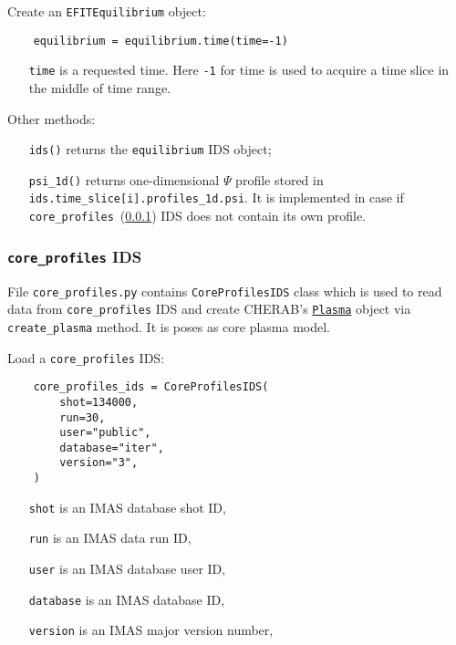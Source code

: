 \documentclass[../main.tex]{subfiles}
\begin{document}
Create an \texttt{EFITEquilibrium} object:
\begin{verbatim}
    equilibrium = equilibrium.time(time=-1)
\end{verbatim}

\begin{itemize}[align=left]
    \item[\texttt{time}] is a requested time. Here \texttt{-1} for time is used to acquire a time slice in the middle of time range.
\end{itemize}

Other methods:
\begin{itemize}[align=left]
    \item[\texttt{ids()}] returns the \texttt{equilibrium} IDS object;
    \item[\texttt{psi\_1d()}] returns one-dimensional $\Psi$ profile stored in \texttt{ids.time\_slice[i].profiles\_1d.psi}. It is implemented in case if \texttt{core\_profiles}~(\cref{sec:core_profiles_ids}) IDS does not contain its own profile.
\end{itemize}

\subsubsection{\texttt{core\_profiles} IDS}%
\label{sec:core_profiles_ids}

File \texttt{core\_profiles.py} contains \texttt{CoreProfilesIDS} class which is used to read data from \texttt{core\_profiles} IDS and create CHERAB's \href{https://cherab.github.io/documentation/plasmas/core_plasma_classes.html?highlight=plasma#cherab.core.Plasma}{\texttt{Plasma}} object via \texttt{create\_plasma} method. It is poses as core plasma model.

Load a \texttt{core\_profiles} IDS:
\begin{verbatim}
    core_profiles_ids = CoreProfilesIDS(
        shot=134000,
        run=30,
        user="public",
        database="iter",
        version="3",
    )
\end{verbatim}

\begin{itemize}[align=left]
    \item[\texttt{shot}] is an IMAS database shot ID,
    \item[\texttt{run}] is an IMAS data run ID,
    \item[\texttt{user}] is an IMAS database user ID,
    \item[\texttt{database}] is an IMAS database ID,
    \item[\texttt{version}] is an IMAS major version number,
\end{itemize}
\end{document}
